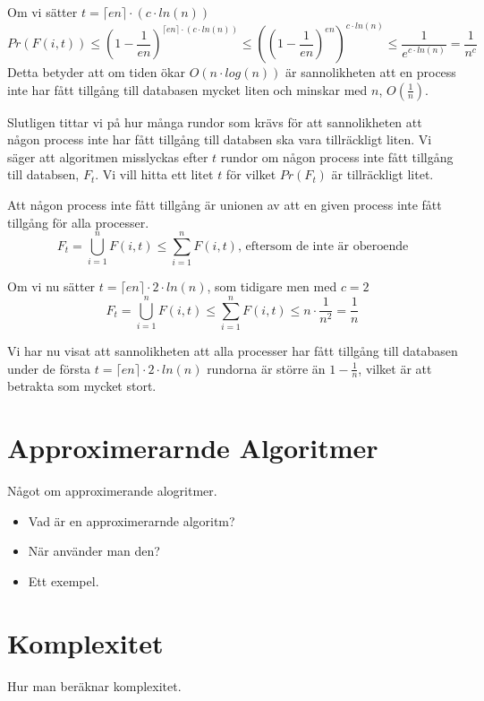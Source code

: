 \documentclass[a4paper]{report}
\begin{document}
Om vi sätter $t = \lceil{}en\rceil \cdot (c\cdot{}ln(n))$
\begin{equation}
	Pr(F(i,t)) \leq (1 - \frac{1}{en})^{\lceil{}en\rceil \cdot (c\cdot{}ln(n))}
	\leq ((1 - \frac{1}{en})^{en})^{c\cdot{}ln(n)} \leq
	\frac{1}{e^{c\cdot{}ln(n)}} = \frac{1}{n^c}
\end{equation}
Detta betyder att om tiden ökar $O(n\cdot{}log(n))$ är sannolikheten att en
process inte har fått tillgång till databasen mycket liten och minskar med $n$,
$O(\frac{1}{n})$.

Slutligen tittar vi på hur många rundor som krävs för att sannolikheten att
någon process inte har fått tillgång till databsen ska vara tillräckligt liten.
Vi säger att algoritmen misslyckas efter $t$ rundor om någon process inte fått
tillgång till databsen, $F_t$. Vi vill hitta ett litet $t$ för vilket $Pr(F_t)$
är tillräckligt litet.

Att någon process inte fått tillgång är unionen av att en given process inte
fått tillgång för alla processer.
\begin{equation}
	F_t = \bigcup_{i=1}^nF(i,t) \leq \sum_{i=1}^nF(i,t)\mbox{, eftersom de inte
	är oberoende}
\end{equation}

Om vi nu sätter $t = \lceil{}en\rceil \cdot 2\cdot{}ln(n)$, som tidigare men med $c = 2$
\begin{equation}
	F_t = \bigcup_{i=1}^nF(i,t) \leq \sum_{i=1}^nF(i,t) \leq n \cdot
	\frac{1}{n^2} =\frac{1}{n} 
\end{equation}

Vi har nu visat att sannolikheten att alla processer har fått tillgång till
databasen under de första $t = \lceil{}en\rceil \cdot 2\cdot{}ln(n)$ rundorna
är större än $1 - \frac{1}{n}$, vilket är att betrakta som mycket stort.


\section{Approximerarnde Algoritmer}

Något om approximerande alogritmer.
\begin{itemize}
	\item Vad är en approximerarnde algoritm?
	\item När använder man den?
	\item Ett exempel.
\end{itemize}

\section{Komplexitet}
Hur man beräknar komplexitet.
\end{document}
